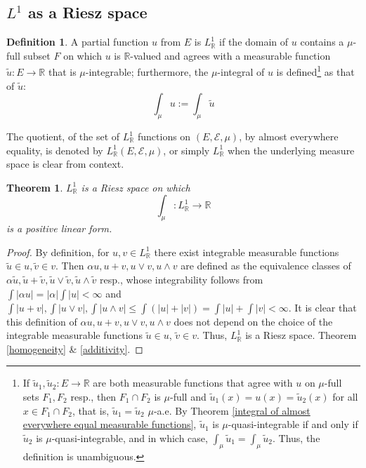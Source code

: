 \documentclass[11pt, a4paper, openany]{book}
\newtheorem{thm}{Theorem}\newtheorem{lem}{Lemma}\newtheorem{crl}{Corollary}
\theoremstyle{definition}
\newtheorem{define}{Definition}\newtheorem{exam}{Example}\newtheorem{remark}{Remark}
\begin{document}
\subsection{\texorpdfstring{$L^1$}{L1} as a Riesz space}
    \begin{define}
        A partial function $u$ from $E$ is $L^1_\mathbb{R}$ if the domain of $u$ contains a $\mu$-full subset $F$ on which $u$ is $\mathbb{R}$-valued and agrees with a measurable function $\tilde{u}:E\rightarrow\mathbb{R}$ that is $\mu$-integrable;
        furthermore, the $\mu$-integral of $u$ is defined\footnote{
            If $\tilde{u}_1,\tilde{u}_2:E\rightarrow \mathbb{R}$ are both measurable functions that agree with $u$ on $\mu$-full sets $F_1,F_2$ resp., then $F_1\cap F_2$ is $\mu$-full and $\tilde{u}_1(x)=u(x)=\tilde{u}_2(x)$ for all $x\in F_1\cap F_2$, that is, $\tilde{u}_1=\tilde{u}_2$ $\mu$-a.e. By Theorem \ref{integral of almost everywhere equal measurable functions}, $\tilde{u}_1$ is $\mu$-quasi-integrable if and only if $\tilde{u}_2$ is $\mu$-quasi-integrable, and in which case, $\int_\mu\tilde{u}_1=\int_\mu\tilde{u}_2$. Thus, the definition is unambiguous.
        } as that of $\tilde{u}$:
        \[
            \int_\mu u:=\int_{\mu}\tilde{u}
        \]
        
        The quotient, of the set of $L^1_\mathbb{R}$ functions on $(E,\mathscr{E},\mu)$, by almost everywhere equality, is denoted by $L^1_\mathbb{R}(E,\mathscr{E},\mu)$, or simply $L^1_\mathbb{R}$ when the underlying measure space is clear from context.
    \end{define}
    \begin{thm}\label{linearity of the integral on L^1}
        $L^1_\mathbb{R}$ is a Riesz space on which
        \[
            \int_\mu:L^1_\mathbb{R}\rightarrow \mathbb{R}
        \]
        is a positive linear form.
    \end{thm}
    \begin{proof}
        By definition, for $u,v\in L^1_\mathbb{R}$ there exist integrable measurable functions $\tilde{u}\in u,\tilde{v}\in v$. Then $\alpha u,u+v,u\vee v, u\wedge v$ are defined as the equivalence classes of $\alpha\tilde{u},\tilde{u}+\tilde{v}, \tilde{u}\vee\tilde{v},\tilde{u}\wedge \tilde{v}$ resp., whose integrability follows from $\int |\alpha u|=|\alpha|\int |u| <\infty$ and $\int |u+v|, \int |u\vee v|, \int |u\wedge v|\leqslant \int (|u|+|v|)=\int |u|+\int |v|<\infty$. It is clear that this definition of $\alpha u,u+v,u\vee v, u\wedge v$ does not depend on the choice of the integrable measurable functions $\tilde{u}\in u$, $\tilde{v}\in v$. Thus, $L^1_\mathbb{R}$ is a Riesz space. Theorem \ref{homogeneity} \& \ref{additivity}.
    \end{proof}
\end{document}
